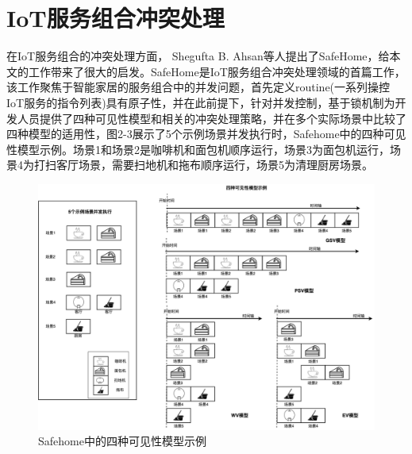 \documentclass[winfonts,master,twoside]{njuthesis}
\begin{document}
\section{IoT服务组合冲突处理}
在IoT服务组合的冲突处理方面， Shegufta B. Ahsan等人\cite{ahsan2021home}\cite{ahsan2019home}提出了SafeHome，给本文的工作带来了很大的启发。SafeHome是IoT服务组合冲突处理领域的首篇工作，该工作聚焦于智能家居的服务组合中的并发问题，首先定义routine(一系列操控IoT服务的指令列表)具有原子性，并在此前提下，针对并发控制，基于锁机制为开发人员提供了四种可见性模型和相关的冲突处理策略，并在多个实际场景中比较了四种模型的适用性，图2-3展示了5个示例场景并发执行时，Safehome中的四种可见性模型示例。场景1和场景2是咖啡机和面包机顺序运行，场景3为面包机运行，场景4为打扫客厅场景，需要扫地机和拖布顺序运行，场景5为清理厨房场景。
\begin{figure}
	\centering
	\includegraphics[width=1.0\textwidth]{figure/2-relatework/safehome.png}
	\caption{Safehome中的四种可见性模型示例}
	\label{ontransact-impl}
\end{figure}
\end{document}

